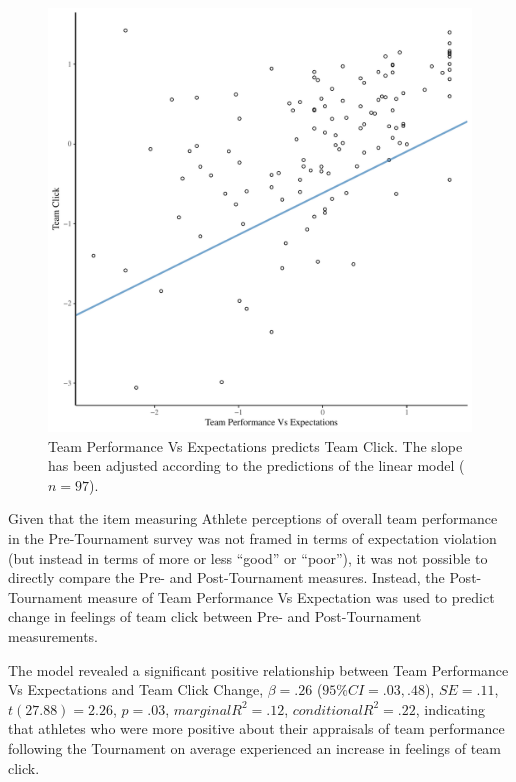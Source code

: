 \begin{CJK}{UTF8}{gbsn}
  \begin{figure}[htbp]
    \centering
  \includegraphics[scale=.5]{images/teamPerfClickModelSlope.pdf}
    \caption{Team Performance Vs Expectations predicts Team Click. The slope has been adjusted according to the predictions of the linear model ($n = 97$).}
    \label{fig:teamPerfClickModelSlope}
  \end{figure}



Given that the item measuring Athlete perceptions of overall team performance in the Pre-Tournament survey was not framed in terms of expectation violation (but instead in terms of more or less ``good'' or ``poor''), it was not possible to directly compare the Pre- and Post-Tournament measures.  Instead, the Post-Tournament measure of Team Performance Vs Expectation was used to predict change in feelings of team click between Pre- and Post-Tournament measurements.

The model revealed a significant positive relationship between Team Performance Vs Expectations and Team Click Change,  $\beta = .26$ ($95\% CI =  .03, .48$), $SE = .11$, $t(27.88) = 2.26$, $p = .03$, $marginal R^2 = .12$, $conditional R^2 = .22$, indicating that athletes who were more positive about their appraisals of team performance following the Tournament on average experienced an increase in feelings of team click.


\end{CJK}
